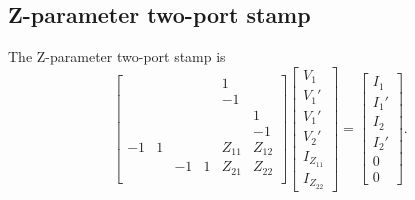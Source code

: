 \documentclass[a4paper, 12pt]{article}
\begin{document}
\subsection{Z-parameter two-port stamp}

The Z-parameter two-port stamp is
%
\begin{equation}
  \begin{bmatrix}
   &   &   &   &  1 &    \\
   &   &   &   & -1 &    \\
   &   &   &   &    &  1 \\
   &   &   &   &    &  -1 \\
   -1& 1 &   &    & Z_{11} & Z_{12} \\
    &   & -1 & 1 & Z_{21} & Z_{22} \\
  \end{bmatrix}
  \begin{bmatrix}
    V_1 \\ V_1' \\ V_1' \\ V_2' \\ I_{Z_{11}} \\ I_{Z_{22}}
  \end{bmatrix}
=
\begin{bmatrix}
  I_1 \\ I_1' \\ I_2 \\ I_2' \\ 0 \\ 0
\end{bmatrix}.
\end{equation}
%
\end{document}
